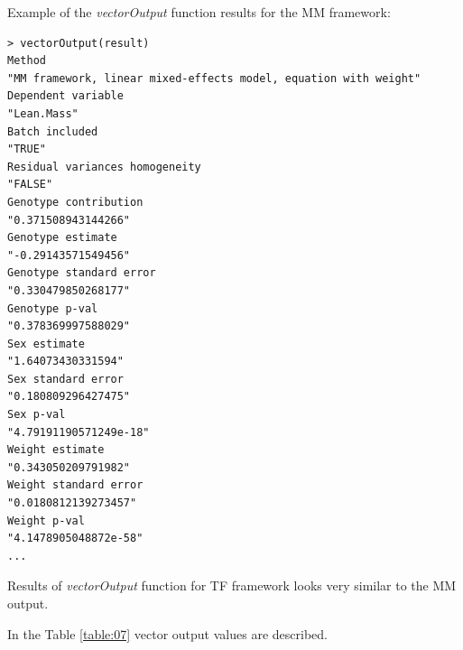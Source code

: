 \documentclass[12pt,a4paper]{article}
\begin{document}
Example of the \textit{vectorOutput} function results for the MM framework:
\begingroup
\fontsize{8pt}{12pt}\selectfont
\begin{verbatim}
> vectorOutput(result)
Method 
"MM framework, linear mixed-effects model, equation with weight" 
Dependent variable 
"Lean.Mass" 
Batch included 
"TRUE" 
Residual variances homogeneity 
"FALSE" 
Genotype contribution 
"0.371508943144266" 
Genotype estimate 
"-0.29143571549456" 
Genotype standard error 
"0.330479850268177" 
Genotype p-val 
"0.378369997588029" 
Sex estimate 
"1.64073430331594" 
Sex standard error 
"0.180809296427475" 
Sex p-val 
"4.79191190571249e-18" 
Weight estimate 
"0.343050209791982" 
Weight standard error 
"0.0180812139273457" 
Weight p-val 
"4.1478905048872e-58" 
...
\end{verbatim}
\endgroup

Results of \textit{vectorOutput} function for TF framework looks very similar to the MM output.

In the Table \ref{table:07} vector output values are described.
\end{document}
